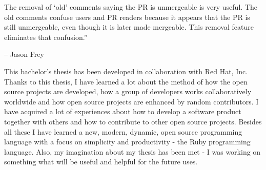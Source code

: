 \begin{displayquote}
{The removal of `old' comments saying the PR is unmergeable is very useful. The old comments confuse users and PR readers because it appears that the PR is still unmergeable, even though it is later made mergeable. This removal feature eliminates that confusion.''\\[-2em]
}
    \begin{flushright}
        -- Jason Frey
    \end{flushright}
\end{displayquote}

This bachelor's thesis has been developed in collaboration with Red Hat, Inc. Thanks to this thesis, I have learned a lot about the method of how the open source projects are developed, how a group of developers works collaboratively worldwide and how open source projects are enhanced by random contributors. I have acquired a lot of experiences about how to develop a software product together with others and how to contribute to other open source projects. Besides all these I have learned a new, modern, dynamic, open source programming language with a focus on simplicity and productivity - the Ruby programming language. Also, my imagination about my thesis has been met - I was working on something what will be useful and helpful for the future uses.
